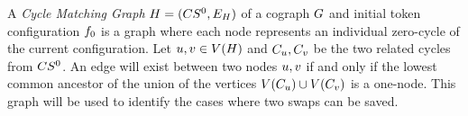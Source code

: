 \documentclass[msc,english,table,xcdraw]{ppgccufmg}
\begin{document}

A \textit{Cycle Matching Graph} $H = (CS^{0}, 
E_{H})$ of a cograph $G$ and initial token 
configuration $f_{0}$ is a graph where each node represents an individual 
zero-cycle of the current configuration. 
Let $u, v \in V(H)$ and $C_{u}, 
C_{v}$ be the two related cycles from $CS^{0}$.
An edge will exist between two nodes $u,v$ if and only if the lowest 
common ancestor of the union of the vertices $V(C_{u}) \cup
V(C_{v})$ is a one-node.
This graph will be used to identify the cases where two swaps can be saved.

\end{document}
